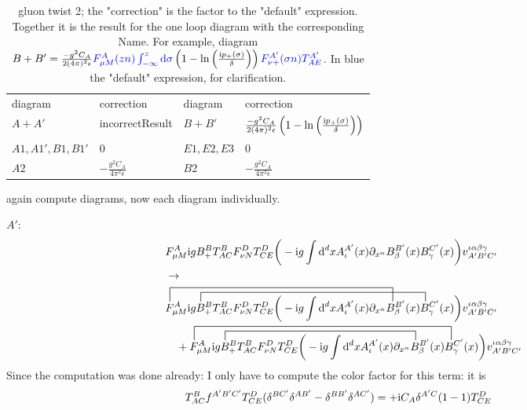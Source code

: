 \begin{table}
	\begin{tabular}{p{2cm}p{6cm}p{2cm}p{6cm}}
		diagram&correction&diagram&correction\\
		$A+A'$ & incorrectResult& $B+B'$ & $\frac{-g^2C_A}{2(4\pi)^2\epsilon}	\left(1-\ln\left(\frac{\text{i} p_{+}(\sigma)}{\delta}\right)\right)$\\
		$A1,A1',B1,B1'$ & $0$& $E1,E2,E3$ & $0$\\
		$A2$ & $-\frac{ g^2 C_A}{4\pi^2 \epsilon} $  & $B2$ & $-\frac{ g^2 C_A}{4\pi^2 \epsilon}$\\
	\end{tabular}
	\caption{gluon twist 2; the "correction" is the factor to the "default" expression. Together it is the result for the one loop diagram with the corresponding Name. For example, diagram $B+B'=\frac{-g^2C_A}{2(4\pi)^2\epsilon}{\color{blue}F_{\mu M}^{A}(zn)\int_{-\infty}^z \text{d}\sigma}	\left(1-\ln\left(\frac{\text{i} p_{+}(\sigma)}{\delta}\right)\right){\color{blue}F_{\nu +}^{A'}(\sigma n)T^{A'}_{AE}}$. In blue the "default" expression, for clarification. }
	\label{Resultsgluontwist2table}
\end{table}
again compute diagrams, now each diagram individually.

$A'$:
\begin{align}
	&\ft_{\mu M}^{A} \imag g B_+^B  T^B_{AC} \ft _{\nu N}^D T^D_{CE}\bigg(-\imag g \int \ddx xA_\iota^{A'}(x) \partial_{x^\alpha} B_\beta^{B'} (x) B_\gamma^{C'}(x) \bigg) v^{\iota \alpha\beta\gamma}_{A'B'C'}
	\\
	&\rightarrow
	\\
	\contraction[3ex]{}{\ft}{_{\mu M}^{A} \imag g B_+^B  T^B_{AC} \ft _{\nu N}^D T^D_{CE}\bigg(-\imag g \int \ddx xA_\iota^{A'}(x) \partial_{x^\alpha}}{B}
	\contraction[2ex]{\ft_{\mu M}^{A} \imag g}{B}{_+^B  T^B_{AC} \ft _{\nu N}^D T^D_{CE}\bigg(-\imag g \int \ddx xA_\iota^{A'}(x) \partial_{x^\alpha} B_\beta^{B'} (x)}{B}
	&\ft_{\mu M}^{A} \imag g B_+^B  T^B_{AC} \ft _{\nu N}^D T^D_{CE}\bigg(-\imag g \int \ddx xA_\iota^{A'}(x) \partial_{x^\alpha} B_\beta^{B'} (x) B_\gamma^{C'}(x) \bigg) v^{\iota \alpha\beta\gamma}_{A'B'C'}
	\nl
	+
	\contraction[3ex]{}{\ft}{_{\mu M}^{A} \imag g B_+^B  T^B_{AC} \ft _{\nu N}^D T^D_{CE}\bigg(-\imag g \int \ddx xA_\iota^{A'}(x) \partial_{x^\alpha} B_\beta^{B'} (x)}{B}
	\contraction[2ex]{\ft_{\mu M}^{A} \imag g}{B}{_+^B  T^B_{AC} \ft _{\nu N}^D T^D_{CE}\bigg(-\imag g \int \ddx xA_\iota^{A'}(x) \partial_{x^\alpha}}{B}
	\ft_{\mu M}^{A} \imag g B_+^B  T^B_{AC} \ft _{\nu N}^D T^D_{CE}\bigg(-\imag g \int \ddx xA_\iota^{A'}(x) \partial_{x^\alpha} B_\beta^{B'} (x) B_\gamma^{C'}(x) \bigg) v^{\iota \alpha\beta\gamma}_{A'B'C'}	
\end{align}
Since the computation was done already: I only have to compute the color factor for this term: it is
\begin{align}
	T^{B}_{AC} f^{A'B'C'} T^D_{CE} (\delta^{BC'}\delta^{AB'} - \delta^{BB'} \delta^{AC'}) &= +\text{i} C_A \delta^{A'C} (1-1) T^D_{CE}
\end{align}

